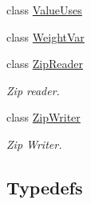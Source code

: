 \begin{DoxyCompactItemize}
class \hyperlink{classglow_1_1_value_uses}{Value\+Uses}
\item 
class \hyperlink{classglow_1_1_weight_var}{Weight\+Var}
\item 
class \hyperlink{classglow_1_1_zip_reader}{Zip\+Reader}
\begin{DoxyCompactList}\small\item\em Zip reader. \end{DoxyCompactList}\item 
class \hyperlink{classglow_1_1_zip_writer}{Zip\+Writer}
\begin{DoxyCompactList}\small\item\em Zip Writer. \end{DoxyCompactList}\end{DoxyCompactItemize}
\subsection*{Typedefs}
